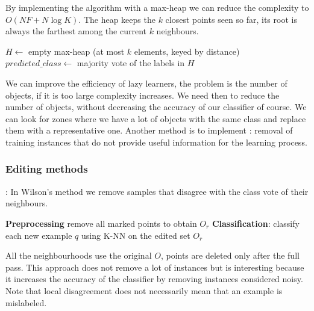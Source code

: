 By implementing the algorithm with a max-heap we can reduce the complexity to $O(NF+N\log{K})$. The heap keeps the $k$ closest points seen so far, its root is always the farthest among the current $k$ neighbours.

\begin{algorithm}[ht]
\caption{Efficient k-Nearest Neighbour}
$H \leftarrow$ empty max-heap (at most $k$ elements, keyed by distance)\;
$predicted\_class \leftarrow$ majority vote of the labels in $H$\;
\;
\end{algorithm}

We can improve the efficiency of lazy learners, the problem is the number of objects, if it is too large complexity increases. We need then to reduce the number of objects, without decreasing the accuracy of our classifier of course. We can look for zones where we have a lot of objects with the same class and replace them with a representative one. Another method is to implement : removal of training instances that do not provide useful information for the learning process.

\subsubsection{Editing methods}

: In Wilson's method we remove samples that disagree with the class vote of their neighbours.

\begin{algorithm}[ht]
\caption{Wilson editing}
\textbf{Preprocessing}\;
remove all marked points to obtain $O_r$\;
\textbf{Classification}: classify each new example $q$ using K-NN on the edited set $O_r$\;
\end{algorithm}

All the neighbourhoods use the original $O$, points are deleted only after the full pass. This approach does not remove a lot of instances but is interesting because it increases the accuracy of the classifier by removing instances considered noisy. Note that local disagreement does not necessarily mean that an example is mislabeled.

